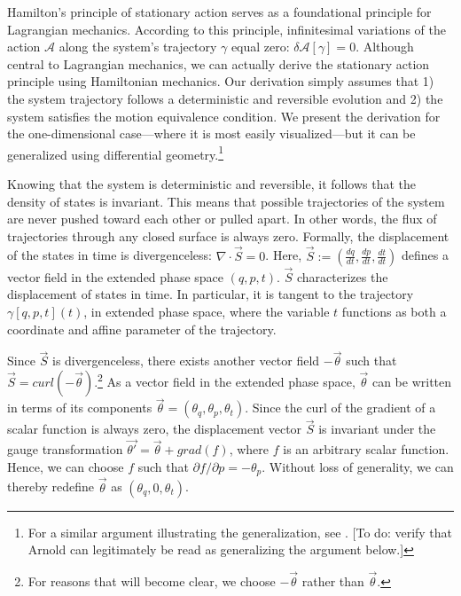 \documentclass[letterpaper]{article}
\renewcommand{\vector}[1]{\ensuremath{\vec{#1}}} %
\begin{document}
Hamilton's principle of stationary action serves as a foundational principle for Lagrangian mechanics. According to this principle, infinitesimal variations of the action $ \mathscr{A}$ along the system's trajectory $\gamma $ equal zero: $\delta  \mathscr{A}[\gamma] = 0 $. Although central to Lagrangian mechanics, we can actually derive the stationary action principle using Hamiltonian mechanics. Our derivation simply assumes that 1) the system trajectory follows a deterministic and reversible evolution and 2) the system satisfies the motion equivalence condition. We present the derivation for the one-dimensional case---where it is most easily visualized---but it can be generalized using differential geometry.\footnote{For a similar argument illustrating the generalization, see \textcites[110]{Arnold1989}. [To do: verify that Arnold can legitimately be read as generalizing the argument below.]}

Knowing that the system is deterministic and reversible, it follows that the density of states is invariant. This means that possible trajectories of the system are never pushed toward each other or pulled apart. In other words, the flux of trajectories through any closed surface is always zero. Formally, the displacement of the states in time is divergenceless: $\nabla \cdot \vector{S} = 0 $. Here, $\vec{S} := (\frac{d q }{d t }, \frac{d p }{d t }, \frac{d t }{d t })$ defines a vector field in the extended phase space $(q, p , t ) $. $\vector{S}$ characterizes the displacement of states in time. In particular, it is tangent to the trajectory $\gamma [q, p, t] (t)$, in extended phase space, where the variable $t$ functions as both a coordinate and affine parameter of the trajectory. 

Since $\vector{S}$ is divergenceless, there exists another vector field $-\vector{\theta}$ such that $\vector{S} = curl(-\vector{\theta} )$.\footnote{For reasons that will become clear, we choose $-\vector{\theta}$ rather than $\vector{\theta}$.} As a vector field in the extended phase space, $\vector{\theta}$ can be written in terms of its components $\vector{\theta} = (\theta_q, \theta_p, \theta_t) $. Since the curl of the gradient of a scalar function is always zero, the displacement vector $\vector{S}$ is invariant under the gauge transformation $\vector{\theta'} =\vector{\theta} + grad(f)$, where $f$ is an arbitrary scalar function. Hence, we can choose $f$ such that $\partial f/ \partial p = -\theta_p $. Without loss of generality, we can thereby redefine $\vector{\theta}$ as $(\theta_q, 0, \theta_t) $.
\end{document}
